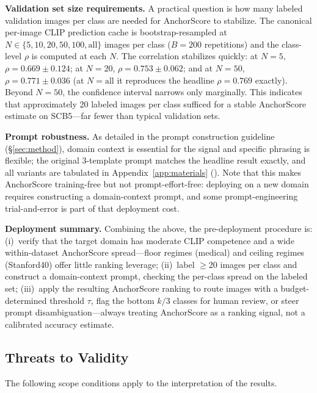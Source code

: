\documentclass[a4paper,fleqn]{cas-sc}
\begin{document}
\textbf{Validation set size requirements.} A practical question is how many labeled validation images per class are needed for AnchorScore to stabilize. The canonical per-image CLIP prediction cache is bootstrap-resampled at $N\in\{5,10,20,50,100,\text{all}\}$ images per class ($B=200$ repetitions) and the class-level $\rho$ is computed at each $N$. The correlation stabilizes quickly: at $N=5$, $\rho=0.669\pm0.124$; at $N=20$, $\rho=0.753\pm0.062$; and at $N=50$, $\rho=0.771\pm0.036$ (at $N=\text{all}$ it reproduces the headline $\rho=0.769$ exactly). Beyond $N=50$, the confidence interval narrows only marginally. This indicates that approximately 20 labeled images per class sufficed for a stable AnchorScore estimate on SCB5---far fewer than typical validation sets.

\textbf{Prompt robustness.} As detailed in the prompt construction guideline (\S\ref{sec:method}), domain context is essential for the signal and specific phrasing is flexible; the original 3-template prompt matches the headline result exactly, and all variants are tabulated in Appendix~\ref{app:materials} (). Note that this makes AnchorScore training-free but not prompt-effort-free: deploying on a new domain requires constructing a domain-context prompt, and some prompt-engineering trial-and-error is part of that deployment cost.

\textbf{Deployment summary.} Combining the above, the pre-deployment procedure is: (i)~verify that the target domain has moderate CLIP competence and a wide within-dataset AnchorScore spread---floor regimes (medical) and ceiling regimes (Stanford40) offer little ranking leverage; (ii)~label $\geq$20 images per class and construct a domain-context prompt, checking the per-class spread on the labeled set; (iii)~apply the resulting AnchorScore ranking to route images with a budget-determined threshold $\tau$, flag the bottom $k/3$ classes for human review, or steer prompt disambiguation---always treating AnchorScore as a ranking signal, not a calibrated accuracy estimate.

\subsection{Threats to Validity}
\label{sec:limitations}

The following scope conditions apply to the interpretation of the results.
\end{document}
